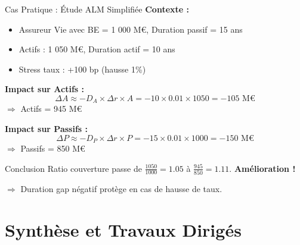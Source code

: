 \documentclass[10pt,aspectratio=169,xcolor={dvipsnames}]{beamer}
\begin{document}
\begin{frame}{Cas Pratique : Étude ALM Simplifiée}
\textbf{Contexte :}
\begin{itemize}
    \item Assureur Vie avec BE = 1 000 M€, Duration passif = 15 ans
    \item Actifs : 1 050 M€, Duration actif = 10 ans
    \item Stress taux : +100 bp (hausse 1\%)
\end{itemize}

\vspace{0.3cm}
\textbf{Impact sur Actifs :}
\[
\Delta A \approx -D_A \times \Delta r \times A = -10 \times 0.01 \times 1050 = -105 \text{ M€}
\]
$\Rightarrow$ Actifs = 945 M€

\vspace{0.3cm}
\textbf{Impact sur Passifs :}
\[
\Delta P \approx -D_P \times \Delta r \times P = -15 \times 0.01 \times 1000 = -150 \text{ M€}
\]
$\Rightarrow$ Passifs = 850 M€

\vspace{0.3cm}
\begin{alertblock}{Conclusion}
Ratio couverture passe de $\frac{1050}{1000} = 1.05$ à $\frac{945}{850} = 1.11$. \textbf{Amélioration !}

$\Rightarrow$ Duration gap négatif protège en cas de hausse de taux.
\end{alertblock}
\end{frame}

\section{Synthèse et Travaux Dirigés}
\end{document}
